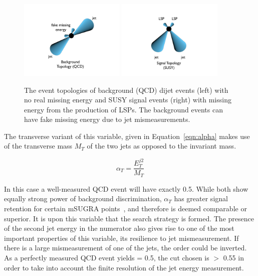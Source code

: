 \begin{figure}[htbp]
\centering
\includegraphics[width=0.45\textwidth,trim=5.5cm 2.5cm 5.5cm 2.5cm, clip=true]{Figures/AlphaT/forZ2.pdf}
\includegraphics[width=0.45\textwidth,trim=5cm 2.5cm 6cm 2.5cm, clip=true]{Figures/AlphaT/forZ1.pdf}
\caption[The event topologies of background (QCD) dijet events (left) with no real missing energy and SUSY signal events (right) with missing energy from the production of LSPs.]{\label{fig:attop}The event topologies of background (QCD) dijet events (left) with no real missing energy and SUSY signal events (right) with missing energy from the production of LSPs. The background events can have fake missing energy due to jet mismeasurements.}
\end{figure}



The transverse variant of this variable, given in Equation~\ref{eqn:alpha} makes use of the transverse mass $M_{T}$ of the two jets as opposed to the invariant mass.

\begin{equation}
\alpha_{T} = \frac{E_{T}^{j2}}{M_{T}} 
\label{eqn:alphat}
\end{equation}

In this case a well-measured QCD event will have exactly 0.5. While both show equally strong power of background discrimination, $\alpha_{T}$ has greater signal retention for certain mSUGRA points~\cite{PASaT}, and therefore is deemed comparable or superior. It is upon this variable that the search strategy is formed. The presence of the second jet energy in the numerator also gives rise to one of the most important properties of this variable, its resilience to jet mismeasurement. If there is a large mismeasurement of one of the jets, the order could be inverted. As a perfectly measured QCD event yields \alt = 0.5, the cut chosen is \alt $>$ 0.55 in order to take into account the finite resolution of the jet energy measurement.  


